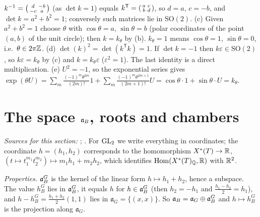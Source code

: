 \begin{remark}
$k^{-1}=\begin{psmallmatrix}d&-b\\-c&a\end{psmallmatrix}$ (as $\det k=1$) equals $k^{\mathsf T}=\begin{psmallmatrix}a&c\\b&d\end{psmallmatrix}$, so $d=a$,
$c=-b$, and $\det k=a^2+b^2=1$; conversely such matrices lie in $\mathrm{SO}(2)$. (c) Given $a^2+b^2=1$ choose $\theta$ with
$\cos\theta=a$, $\sin\theta=b$ (polar coordinates of the point $(a,b)$ of the unit circle); then $k=k_\theta$ by (b).
$k_\theta=1$ means $\cos\theta=1$, $\sin\theta=0$, i.e.\ $\theta\in2\pi\mathbb{Z}$. (d) $\det(k)^2=\det(k^{\mathsf T}k)=1$. If
$\det k=-1$ then $k\varepsilon\in\mathrm{SO}(2)$, so $k\varepsilon=k_\theta$ by (c) and $k=k_\theta\varepsilon$ ($\varepsilon^2=1$). The last
identity is a direct multiplication. (e) $U^2=-1$, so the exponential series gives
$\exp(\theta U)=\sum_m\frac{(-1)^m\theta^{2m}}{(2m)!}1+\sum_m\frac{(-1)^m\theta^{2m+1}}{(2m+1)!}U=\cos\theta\cdot1+\sin\theta\cdot U=k_\theta$.
\end{remark}

\section{\texorpdfstring{The space $\mathfrak{a}_B$, roots and chambers}{The space 𝔞B, roots and chambers}}\label{sec:conv-aB}

\noindent\emph{Sources for this section:} \cite[§§2, 5]{AIntro}; \cite[§1]{A-Tr}. For $\mathrm{GL}_2$ we write everything in
coordinates; the coordinate $h=(h_1,h_2)$ corresponds to the homomorphism $X^*(T)\to\mathbb{R}$,
$(t\mapsto t_1^{m_1}t_2^{m_2})\mapsto m_1h_1+m_2h_2$, which identifies $\operatorname{Hom}(X^*(T)_{\mathbb{Q}},\mathbb{R})$ with $\mathbb{R}^2$.

\begin{definition}
\end{definition}

\begin{definition}
\end{definition}
\noindent\emph{Properties.} $\mathfrak{a}_B^G$ is the kernel of the linear form $h\mapsto h_1+h_2$, hence a subspace. The value
$h_B^G$ lies in $\mathfrak{a}_B^G$, it equals $h$ for $h\in\mathfrak{a}_B^G$ (then $h_2=-h_1$ and $\frac{h_1-h_2}2=h_1$), and
$h-h_B^G=\frac{h_1+h_2}2(1,1)$ lies in $\mathfrak a_G=\{(x,x)\}$. So $\mathfrak{a}_B=\mathfrak a_G\oplus\mathfrak{a}_B^G$ and $h\mapsto h_B^G$
is the projection along $\mathfrak a_G$.

